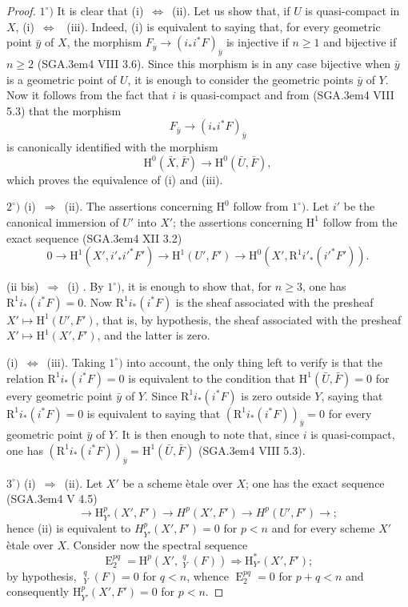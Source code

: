 \documentclass[11pt,a4paper,oneside]{book}
\providecommand{\pageoriginale}{%
  \refstepcounter{pageoriginal}%
  \marginpar{\raggedright\footnotesize\bfseries\thepageoriginal}%
  \xspace}
\providecommand{\SGA}{\textup{SGA}\kern.3em}
\DeclareMathOperator{\E}{E}
\providecommand{\h}{\mathop{\underline{H}}\nolimits}
\renewcommand{\H}{\mathrm H}
\providecommand{\R}{\mathrm R}
\providecommand{\mto}{\longmapsto}
\providecommand{\To}{\Longrightarrow}
\providecommand{\SSI}{\unskip~$\Longleftrightarrow$~\ignorespaces}
\providecommand{\ALORS}{\unskip~$\Longrightarrow$~\ignorespaces}
\providecommand{\skpt}{}
\theoremstyle{plain}
\theoremstyle{definition}
\theoremstyle{remark}
\begin{document}
\skpt
\begin{proof}
$1^\circ)$ It is clear that \textup{(i)}\SSI \textup{(ii)}.
Let us show that, if $U$ is quasi-compact in $X$, \textup{(i)}\SSI
\textup{(iii)}. Indeed, \textup{(i)} is equivalent to saying that, for
every geometric point $\bar{y}$ of $X$, the morphism
$F_{\bar{y}}\to (i_*i^*F)_{\bar{y}}$ is injective if $n\geq 1$ and
bijective if $n\geq 2$ (\SGA 4 VIII 3.6). Since this morphism is in
any case bijective when $\bar{y}$ is a geometric point of $U$, it is
enough to consider the geometric points $\bar{y}$ of $Y$. Now it
follows from the fact that $i$ is quasi-compact and from
(\SGA 4 VIII 5.3) that the morphism
$$F_{\bar{y}}\to (i_*i^*F)_{\bar{y}}$$
is canonically identified with the morphism
$$
\H^0(\bar{X}, \bar{F})\to \H^0(\bar{U}, \bar{F}),
$$
which proves the equivalence of \textup{(i)} and \textup{(iii)}.

$2^\circ)$ \textup{(i)}\ALORS \textup{(ii)}. The assertions concerning $\H^0$ follow from $1^\circ)$. Let $i'$ be the canonical immersion of $U'$ into $X'$; the assertions concerning $\H^1$ follow from the exact sequence (\SGA 4 XII 3.2)
$$0\to \H^1(X', i'_*i'^*F')\to \H^1(U', F')\to \H^0(X', \R^1i'_*(i'^*F')).
$$

(ii bis)\ALORS \textup{(i)}\pageoriginale. By $1^\circ)$, it is enough to show that, for $n\geq 3$, one has $\R^1i_*(i^*F)=0$. Now $\R^1i_*(i^*F)$ is the sheaf associated with the presheaf $X'\mto \H^1(U', F')$, that is, by hypothesis, the sheaf associated with the presheaf $X'\mto \H^1(X', F')$, and the latter is zero.

\textup{(i)}\SSI \textup{(iii)}. Taking $1^\circ)$ into account, the only thing left to verify is that the relation $\R^1i_*(i^*F)=0$ is equivalent to the condition that $\H^1(\bar U, \bar F)=0$ for every geometric point $\bar y$ of $Y$. Since $\R^1i_*(i^*F)$ is zero outside $Y$, saying that $\R^1i_*(i^*F)=0$ is equivalent to saying that $(\R^1i_*(i^*F))_{\bar y}=0$ for every geometric point $\bar y$ of $Y$. It is then enough to note that, since $i$ is quasi-compact, one has $(\R^1i_*(i^*F))_{\bar y}=\H^1(\bar U, \bar F)$ (\SGA 4 VIII 5.3).

$3^\circ)$ \textup{(i)}\ALORS \textup{(ii)}. Let $X'$ be a scheme \`etale over $X$; one has the exact sequence (\SGA 4 V 4.5)
\begin{equation*} \label{eq:XIV.1.1.*} \tag{$*$} {\to \H^p_{Y'}(X', F')\to H^p(X', F')\to H^p(U', F')\to};
\end{equation*}
hence \textup{(ii)} is equivalent to $H^p_{Y'}(X', F')=0$ for $p<n$ and for every scheme $X'$ \`etale over $X$. Consider now the spectral sequence
$$
\E_2^{pq}=\H^p(X', {\h}_Y^q(F))\To \H_{Y'}^*(X', F');$$
by hypothesis, ${\h}_Y^q(F)=0$ for $q<n$, whence $\E_2^{pq}=0$ for $p+q<n$ and consequently $\H_{Y'}^p(X', F')=0$ for $p<n$.


\end{proof}
\end{document}
